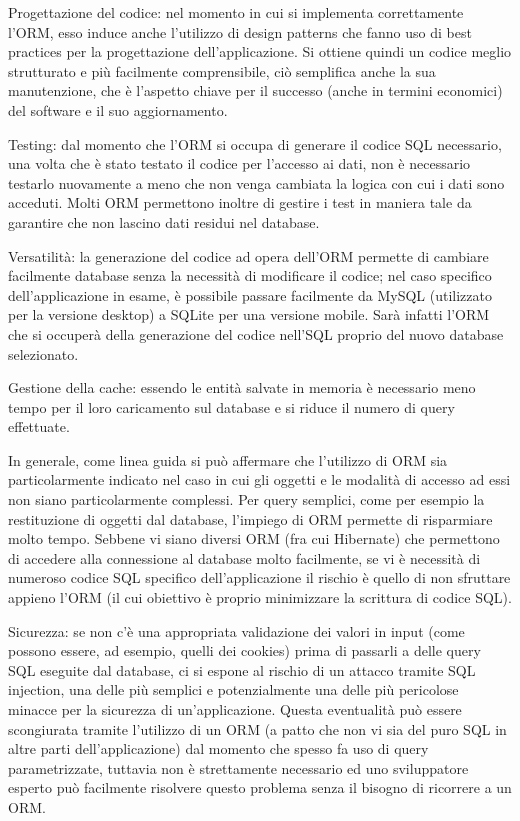 Progettazione del codice: nel momento in cui si implementa correttamente l'ORM, esso induce anche l'utilizzo di design patterns che fanno uso di best practices per la progettazione dell'applicazione. Si ottiene quindi un codice meglio strutturato e più facilmente comprensibile, ciò semplifica anche la sua manutenzione, che è l'aspetto chiave per il successo (anche in termini economici) del software e il suo aggiornamento.

Testing: dal momento che l'ORM si occupa di generare il codice SQL necessario, una volta che è stato testato il codice per l'accesso ai dati, non è necessario testarlo nuovamente a meno che non venga cambiata la logica con cui i dati sono acceduti. Molti ORM permettono inoltre di gestire i test in maniera tale da garantire che non lascino dati residui nel database.

Versatilità: la generazione del codice ad opera dell'ORM permette di cambiare facilmente database senza la necessità di modificare il codice; nel caso specifico dell'applicazione in esame, è possibile passare facilmente da MySQL (utilizzato per la versione desktop) a SQLite per una versione mobile. Sarà infatti l'ORM che si occuperà della generazione del codice nell'SQL proprio del nuovo database selezionato.

Gestione della cache: essendo le entità salvate in memoria è necessario meno tempo per il loro caricamento sul database e si riduce il numero di query effettuate.

In generale, come linea guida si può affermare che l'utilizzo di ORM sia particolarmente indicato nel caso in cui gli oggetti e le modalità di accesso ad essi non siano particolarmente complessi. Per query semplici, come per esempio la restituzione di oggetti dal database, l'impiego di ORM permette di risparmiare molto tempo. Sebbene vi siano diversi ORM (fra cui Hibernate) che permettono di accedere alla connessione al database molto facilmente, se vi è necessità di numeroso codice SQL specifico dell'applicazione il rischio è quello di non sfruttare appieno l'ORM (il cui obiettivo è proprio minimizzare la scrittura di codice SQL).

Sicurezza: se non c'è una appropriata validazione dei valori in input (come possono essere, ad esempio, quelli dei cookies) prima di passarli a delle query SQL eseguite dal database, ci si espone al rischio di un attacco tramite SQL injection, una delle più semplici e potenzialmente una delle più pericolose minacce per la sicurezza di un'applicazione. Questa eventualità può essere scongiurata tramite l'utilizzo di un ORM (a patto che non vi sia del puro SQL in altre parti dell'applicazione) dal momento che spesso fa uso di query parametrizzate, tuttavia non è strettamente necessario ed uno sviluppatore esperto può facilmente risolvere questo problema senza il bisogno di ricorrere a un ORM.

